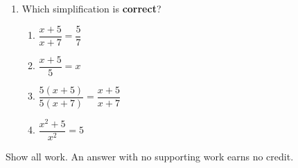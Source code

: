 \begin{enumerate}[leftmargin=1.8em, itemsep=6pt, topsep=5pt]
\item Which simplification is \textbf{correct}?
\begin{enumerate}[label=(\Alph*), leftmargin=2.2em, itemsep=1pt, topsep=2pt]
  \item $\dfrac{x+5}{x+7} = \dfrac{5}{7}$
  \item $\dfrac{x+5}{5} = x$
  \item $\dfrac{5(x+5)}{5(x+7)} = \dfrac{x+5}{x+7}$
  \item $\dfrac{x^2+5}{x^2} = 5$
\end{enumerate}

\end{enumerate}


\noindent\small Show all work. An answer with no supporting work earns no credit.

